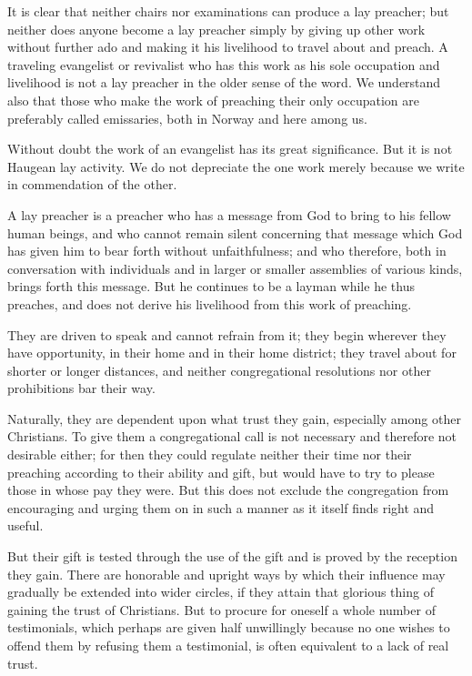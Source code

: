 It is clear that neither chairs nor examinations can produce a lay preacher; but neither does anyone become a lay preacher simply by giving up other work without further ado and making it his livelihood to travel about and preach. A traveling evangelist or revivalist who has this work as his sole occupation and livelihood is not a lay preacher in the older sense of the word. We understand also that those who make the work of preaching their only occupation are preferably called emissaries, both in Norway and here among us.

Without doubt the work of an evangelist has its great significance. But it is not Haugean lay activity. We do not depreciate the one work merely because we write in commendation of the other.

A lay preacher is a preacher who has a message from God to bring to his fellow human beings, and who cannot remain silent concerning that message which God has given him to bear forth without unfaithfulness; and who therefore, both in conversation with individuals and in larger or smaller assemblies of various kinds, brings forth this message. But he continues to be a layman while he thus preaches, and does not derive his livelihood from this work of preaching.

They are driven to speak and cannot refrain from it; they begin wherever they have opportunity, in their home and in their home district; they travel about for shorter or longer distances, and neither congregational resolutions nor other prohibitions bar their way.

Naturally, they are dependent upon what trust they gain, especially among other Christians. To give them a congregational call is not necessary and therefore not desirable either; for then they could regulate neither their time nor their preaching according to their ability and gift, but would have to try to please those in whose pay they were. But this does not exclude the congregation from encouraging and urging them on in such a manner as it itself finds right and useful.

But their gift is tested through the use of the gift and is proved by the reception they gain. There are honorable and upright ways by which their influence may gradually be extended into wider circles, if they attain that glorious thing of gaining the trust of Christians. But to procure for oneself a whole number of testimonials, which perhaps are given half unwillingly because no one wishes to offend them by refusing them a testimonial, is often equivalent to a lack of real trust.

